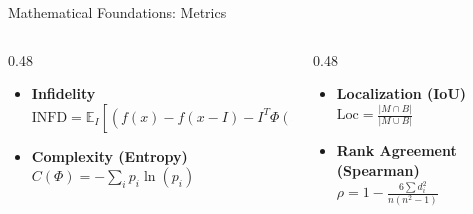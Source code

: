 \documentclass[aspectratio=169]{beamer}
\begin{document}
\begin{frame}{Mathematical Foundations: Metrics}
    \begin{columns}
        \begin{column}{0.48\textwidth}
            \begin{itemize}
                \item \textbf{Infidelity} \\
                {\small $\text{INFD} = \mathbb{E}_{I} \left[ \left( f(x) - f(x - I) - I^T \Phi(x) \right)^2 \right]$}
                \item \textbf{Complexity (Entropy)} \\
                {\small $C(\Phi) = - \sum_i p_i \ln(p_i)$}
            \end{itemize}
        \end{column}
        \begin{column}{0.48\textwidth}
            \begin{itemize}
                \item \textbf{Localization (IoU)} \\
                {\small $\text{Loc} = \frac{|M \cap B|}{|M \cup B|}$}
                \item \textbf{Rank Agreement (Spearman)} \\
                {\small $\rho = 1 - \frac{6 \sum d_i^2}{n(n^2 - 1)}$}
            \end{itemize}
        \end{column}
    \end{columns}
\end{frame}
\end{document}
